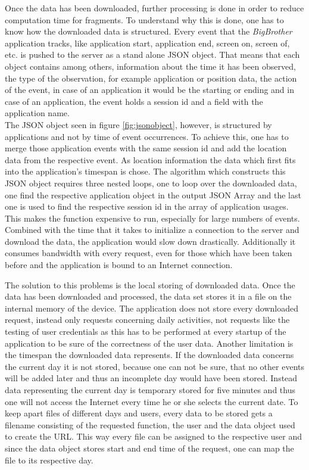Once  the data has been downloaded, further processing is done in order to reduce computation time for fragments. To understand why this is done, one has to know how the downloaded data is structured. Every event that the \emph{BigBrother} application tracks, like application start, application end, screen on, screen of, etc. is pushed to the server as a stand alone JSON object. That means that each object contains among others, information about the time it has been observed, the type of the observation, for example application or position data, the action of the event, in case of an application it would be the starting or ending and in case of an application, the event holds a session id and a field with the application name.\\
The JSON object seen in figure \ref{fig:jsonobject}, however, is structured by applications and not by time of event occurrences. To achieve this, one has to merge those application events with the same session id and add the location data from the respective event. As location information the data which first fits into the application's timespan is chose. The algorithm which constructs this JSON object requires three nested loops, one to loop over the downloaded data, one find the respective application object in the output JSON Array and the last one is used to find the respective session id in the array of application usages. This makes the function expensive to run, especially for large numbers of events. Combined with the time that it takes to initialize a connection to the server and download the data, the application would slow down drastically. Additionally it consumes bandwidth with every request, even for those which have been taken before and the application is bound to an Internet connection.

The  solution to this problems is the local storing of downloaded data. Once the data has been downloaded and processed, the data set stores it in a file on the internal memory of the device. The application does not store every downloaded request, instead only requests concerning daily activities, not requests like the testing of user credentials as this has to be performed at every startup of the application to be sure of the correctness of the user data. Another limitation is the timespan the downloaded data represents. If the downloaded data concerns the current day it is not stored, because one can not be sure, that no other events will be added later and thus an incomplete day would have been stored. Instead data representing the current day is temporary stored for five minutes and thus one will not access the Internet every time he or she selects the current date.
To keep apart files of different days and users, every data to be stored gets a filename consisting of the requested function, the user and the data object used to create the URL. This way every file can be assigned to the respective user and since the data object stores start and end time of the request, one can map the file to its respective day.

